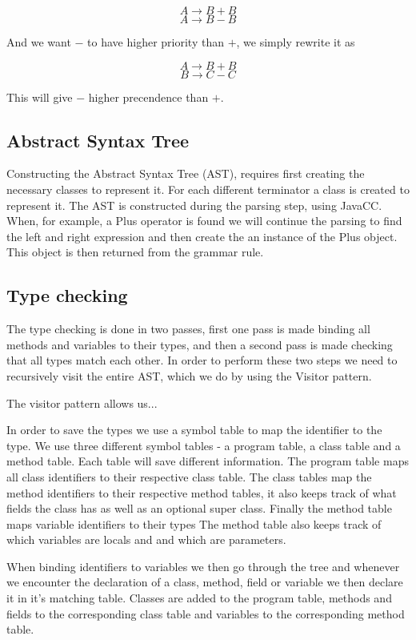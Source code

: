 \documentclass[a4paper]{article}
\begin{document}
$$A \rightarrow B + B$$
$$A \rightarrow B - B$$

And we want $-$ to have higher priority than $+$, we simply rewrite it as

$$A \rightarrow B + B$$
$$B \rightarrow C - C$$

This will give $-$ higher precendence than $+$.

\subsection{Abstract Syntax Tree}
Constructing the Abstract Syntax Tree (AST), requires first creating the necessary classes to represent it. For each different terminator a class is created to represent it. The AST is constructed during the parsing step, using JavaCC. When, for example, a Plus operator is found we will continue the parsing to find the left and right expression and then create the an instance of the Plus object. This object is then returned from the grammar rule.

\subsection{Type checking}
The type checking is done in two passes, first one pass is made binding all methods and variables to their types, and then a second pass is made checking that all types match each other. In order to perform these two steps we need to recursively visit the entire AST, which we do by using the Visitor pattern.

The visitor pattern allows us...

In order to save the types we use a symbol table to map the identifier to the type. We use three different symbol tables - a program table, a class table and a method table. Each table will save different information. The program table maps all class identifiers to their respective class table. The class tables map the method identifiers to their respective method tables, it also keeps track of what fields the class has as well as an optional super class. Finally the method table maps variable identifiers to their types The method table also keeps track of which variables are locals and and which are parameters.

When binding identifiers to variables we then go through the tree and whenever we encounter the declaration of a class, method, field or variable we then declare it in it's matching table. Classes are added to the program table, methods and fields to the corresponding class table and variables to the corresponding method table.
\end{document}
